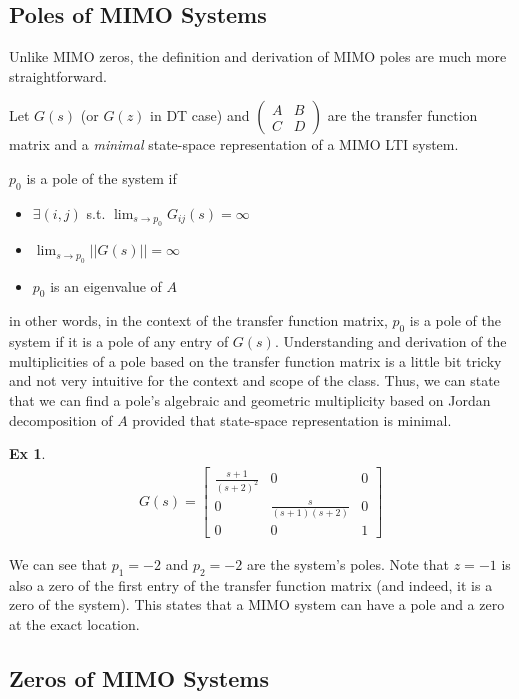 \documentclass[twoside]{article}
\newtheorem{exmp}[theorem]{Ex}
\begin{document}
\newpage

\subsection{Poles of MIMO Systems}

Unlike MIMO zeros, the definition and derivation of MIMO poles are much more straightforward. 

Let $G(s)$ (or $G(z)$ in DT case) and $\left( \begin{array}{c|c} A & B \\ \hline C & D  \end{array} \right)$ are the transfer function matrix and a \textit{minimal} state-space representation of a MIMO LTI system.

$p_0$ is a pole of the system if 
%
\begin{itemize}
 \item $\exists (i,j)$ s.t. $\lim_{s \to p_0}G_{ij}(s) = \infty$
 \item $\lim_{s \to p_0} || G(s) || = \infty$
 \item $p_0$ is an eigenvalue of $A$
\end{itemize}
%
in other words, in the context of the transfer function matrix, $p_0$ is a pole of the system if it is a pole of any entry of $G(s)$. Understanding and derivation of the multiplicities of a pole based on the transfer function matrix is a little bit tricky and not very intuitive for the context and scope of the class. Thus, we can state that we can find a pole's algebraic and geometric multiplicity based on Jordan decomposition of $A$ provided that state-space representation is minimal. 
%
\begin{exmp}
	\begin{align*}
	G(s) = \left[ \begin{array}{ccc} \frac{s+1}{(s+2)^2} & 0 & 0 \\  
	0 & \frac{s}{(s+1)(s+2)} & 0 \\ 0 & 0 & 1  \end{array} \right]
	\end{align*}
\end{exmp}
%
We can see that $p_1 = -2$ and $p_2 = -2$ are the system's poles. Note that $z = -1$ is also a zero of the 
first entry of the transfer function matrix (and indeed, it is a zero of the system). This states that a MIMO system can have 
a pole and a zero at the exact location. 

\subsection{Zeros of MIMO Systems}
\end{document}
